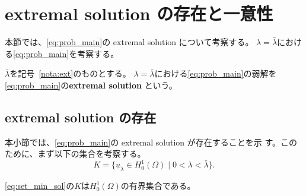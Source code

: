 \section{extremal solution の存在と一意性} \label{sec:extremal_sol}

本節では、\ref{eq:prob_main}の extremal solution について考察する。
$\lambda = \bar{\lambda}$における\ref{eq:prob_main}を考察する。

\begin{defn}
 $\bar{\lambda}$を記号~\ref{nota:ext}のものとする。
 $\lambda = \bar{\lambda}$における\ref{eq:prob_main}の弱解を
 \ref{eq:prob_main}の{\bf extremal solution }という。
\end{defn}

\subsection{extremal solution の存在}

本小節では、\ref{eq:prob_main}の extremal solution が存在することを示
す。このために、まず以下の集合を考察する。
\begin{equation}
 K = \{ \underline{u}_\lambda \in H_0^1(\Omega) \mid 0 < \lambda <
  \bar{\lambda} \}.
  \label{eq:set_min_sol}
\end{equation}

\begin{lem} \label{lem:set_min_sol}
 \eqref{eq:set_min_sol}の$K$は$H_0^1(\Omega)$の有界集合である。
\end{lem}

